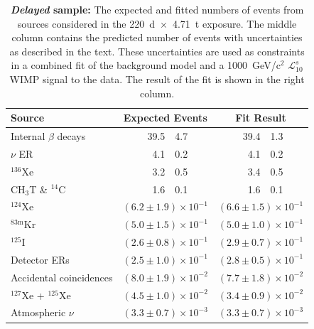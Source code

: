 \setlength{\tabcolsep}{12pt} %
\begin{table}[ht]
    \centering
    \caption{\textbf{\emph{Delayed} sample:}
    The expected and fitted numbers of events from sources considered in the 220~d~$\times$~4.71~t exposure.
    The middle column contains the predicted number of events with uncertainties as described in the text.
    These uncertainties are used as constraints in a combined fit of the background model and a 1000~GeV/c$^2$ $\mathcal{L}^{s}_{10}$ WIMP signal to the data.
    The result of the fit is shown in the right column.}
    \begin{tabular}{l
            r@{$\,\pm\,$}l
            r@{$\,\pm\,$}l}
     \hline 
     \hline 
     Source & \multicolumn{2}{c}{Expected Events} & \multicolumn{2}{c}{Fit Result} \\ \hline
     Internal $\beta$ decays          & 39.5    & 4.7            & 39.4    & 1.3 \\
     $\nu$ ER                         & 4.1     & 0.2            & 4.1     & 0.2 \\
     $^{136}$Xe                       & 3.2     & 0.5            & 3.4     & 0.5 \\
     CH$_3$T \& $^{14}$C              & 1.6     & 0.1            & 1.6     & 0.1 \\
     $^{124}$Xe                      & \multicolumn{2}{c}{$(6.2 \pm 1.9) \times 10^{-1}$} & \multicolumn{2}{c}{$(6.6 \pm 1.5) \times 10^{-1}$} \\
     $^{83\mathrm{m}}$Kr             & \multicolumn{2}{c}{$(5.0 \pm 1.5) \times 10^{-1}$} & \multicolumn{2}{c}{$(5.0 \pm 1.0) \times 10^{-1}$} \\
     $^{125}$I                       & \multicolumn{2}{c}{$(2.6 \pm 0.8) \times 10^{-1}$} & \multicolumn{2}{c}{$(2.9 \pm 0.7) \times 10^{-1}$} \\
     Detector ERs                    & \multicolumn{2}{c}{$(2.5 \pm 1.0) \times 10^{-1}$} & \multicolumn{2}{c}{$(2.8 \pm 0.5) \times 10^{-1}$} \\
     Accidental coincidences         & \multicolumn{2}{c}{$(8.0 \pm 1.9) \times 10^{-2}$} & \multicolumn{2}{c}{$(7.7 \pm 1.8) \times 10^{-2}$} \\
     $^{127}$Xe + $^{125}$Xe         & \multicolumn{2}{c}{$(4.5 \pm 1.0) \times 10^{-2}$} & \multicolumn{2}{c}{$(3.4 \pm 0.9) \times 10^{-2}$} \\
     Atmospheric $\nu$               & \multicolumn{2}{c}{$(3.3 \pm 0.7) \times 10^{-3}$} & \multicolumn{2}{c}{$(3.3 \pm 0.7) \times 10^{-3}$} \\

\end{tabular}
\end{table}
